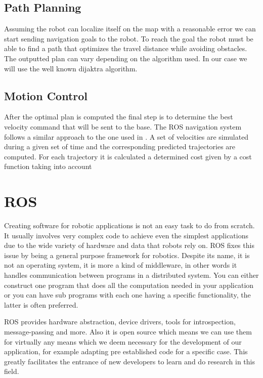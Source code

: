 \subsection{Path Planning}
Assuming the robot can localize itself on the map with a reasonable error we can start sending navigation goals to the robot. To reach the goal the robot must be able to find a path that optimizes the travel distance while avoiding obstacles. The outputted plan can vary depending on the algorithm used. In our case we will use the well known dijaktra algorithm.
\subsection{Motion Control}
After the optimal plan is computed the final step is to determine the best velocity command that will be sent to the base.  The ROS navigation system follows a similar approach to the one used in \cite{gerkey2008planning}. A set of velocities are simulated during a given set of time and the corresponding predicted trajectories are  computed. For each trajectory it is calculated a determined cost given by a cost function  taking into account 

\section {ROS}
Creating software for robotic applications is not an easy task to do from scratch. It usually involves very complex code to achieve even the simplest applications due to the wide variety of hardware and data that robots rely on. \ac{ROS} fixes this issue by being a general purpose framework for robotics. Despite its name, it is not an operating system, it is more a kind of middleware, in other words it  handles communication between programs in a distributed system. You can either construct one program that does all the computation needed in your application or you can have sub programs with each one having a specific functionality, the latter is often preferred.

\ac{ROS} provides hardware abstraction, device drivers, tools for introspection, message-passing and more. Also it is open source which means we can use them for virtually any means which we deem necessary for the development of our application, for example adapting pre established code for a specific case. This greatly facilitates the entrance of new developers to learn and do research in this field.
